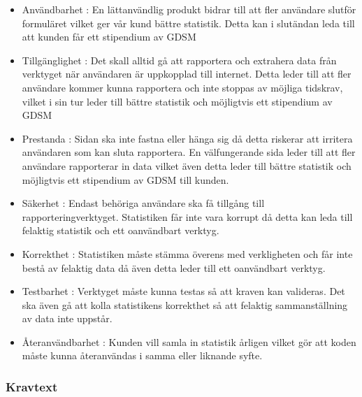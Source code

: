 \documentclass[12pt]{article}
\begin{document}
\begin{itemize}

    \item Användbarhet : En lättanvändlig produkt bidrar till att fler användare slutför formuläret vilket ger vår kund bättre statistik. Detta kan i slutändan leda till att kunden får ett stipendium av GDSM
    
     \item Tillgänglighet : Det skall alltid gå att rapportera och extrahera data från verktyget när användaren är uppkopplad till internet. Detta leder till att fler användare kommer kunna rapportera och inte stoppas av möjliga tidskrav, vilket i sin tur leder till bättre statistik och möjligtvis ett stipendium av GDSM
 
     
   \item Prestanda : Sidan ska inte fastna eller hänga sig då detta riskerar att irritera användaren som kan sluta rapportera. En välfungerande sida leder till att fler användare rapporterar in data vilket även detta leder till bättre statistik och möjligtvis ett stipendium av GDSM till kunden.

     \item Säkerhet : Endast behöriga användare ska få tillgång till rapporteringverktyget. Statistiken får inte vara korrupt då detta kan leda till felaktig statistik och ett oanvändbart verktyg.
     
     \item Korrekthet : Statistiken måste stämma överens med verkligheten och får inte bestå av felaktig data då även detta leder till ett oanvändbart verktyg.
     \\
     
     \item Testbarhet : Verktyget måste kunna testas så att kraven kan valideras. Det ska även gå att kolla statistikens korrekthet så att felaktig sammanställning av data inte uppstår.
     
     \item Återanvändbarhet : Kunden vill samla in statistik årligen vilket gör att koden måste kunna återanvändas i samma eller liknande syfte.
     
\end{itemize}

\subsubsection{Kravtext}
\end{document}
